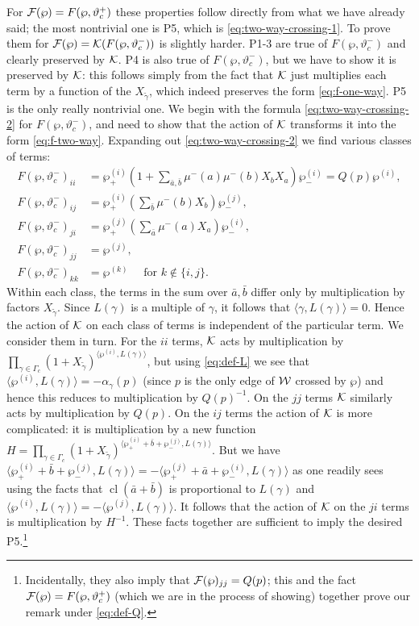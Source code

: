 \documentclass[11pt,a4paper]{article}
\def\CK {{\cal K}}
\def\CF {{\cal F}}
\def\wnet {{\cal W}}
\def\CK{{\cal K}}
\def\CK {{\cal K}}
\def\CF {{\cal F}}
\def\wnet {{\cal W}}
\def\CK{{\cal K}}
\newcommand{\inprod}[1]{\langle#1\rangle}
\DeclareMathOperator{\cl}{{cl}}
\begin{document}
For $\CF(\wp) = F(\wp, \vartheta_c^+)$ these properties follow directly from what we have already said; the most nontrivial one is
P5, which is \eqref{eq:two-way-crossing-1}.  To prove them for
$\CF(\wp) = \CK(F(\wp, \vartheta_c^-))$ is slightly harder.
P1-3 are true of $F(\wp, \vartheta_c^-)$ and clearly preserved by $\CK$.
P4 is also true of $F(\wp, \vartheta_c^-)$, but we have to show it is preserved by $\CK$:
this follows simply from the fact that $\CK$ just multiplies each term by a function of the $X_{\tilde \gamma}$,
which indeed preserves the form \eqref{eq:f-one-way}.  P5 is the only really nontrivial one.  We begin with
the formula \eqref{eq:two-way-crossing-2} for $F(\wp, \vartheta_c^-)$, and need to show that the action of $\CK$
transforms it into the form \eqref{eq:f-two-way}.  Expanding out \eqref{eq:two-way-crossing-2} we find
various classes of terms:
\begin{align}
 F(\wp, \vartheta_c^-)_{ii} &= \wp_+^{(i)} \left( 1 + \sum_{\bar a, \bar b} \mu^-(a) \mu^-(b) X_b X_a \right) \wp_-^{(i)} = Q(p) \wp^{(i)}, \\
 F(\wp, \vartheta_c^-)_{ij} &= \wp_+^{(i)} \left( \sum_{\bar b} \mu^-(b) X_b \right) \wp_-^{(j)}, \\
 F(\wp, \vartheta_c^-)_{ji} &= \wp_+^{(j)} \left( \sum_{\bar a} \mu^-(a) X_a \right) \wp_-^{(i)}, \\
 F(\wp, \vartheta_c^-)_{jj} &= \wp^{(j)}, \\
 F(\wp, \vartheta_c^-)_{kk} &= \wp^{(k)} \quad \text{ for } k \notin \{i,j\}.
\end{align}
Within each class, the terms in the sum over $\bar a, \bar b$
differ only by multiplication by factors $X_{\tilde\gamma}$.  Since $L(\gamma)$ is a multiple of
$\gamma$, it follows that $\inprod{\gamma, L(\gamma)} = 0$.  Hence the action of $\CK$ on each class of terms is independent
of the particular term.  We consider them in turn.  For the $ii$ terms, $\CK$ acts by multiplication by
$\prod_{\gamma \in \Gamma_c} (1 + X_{\tilde\gamma})^{\inprod{\wp^{(i)}, L(\gamma)}}$, but using \eqref{eq:def-L}
we see that $\inprod{\wp^{(i)}, L(\gamma)} = -\alpha_\gamma(p)$
(since $p$ is the only edge of $\wnet$ crossed by $\wp$) and hence this reduces to
multiplication by $Q(p)^{-1}$.  On the $jj$ terms $\CK$ similarly acts by multiplication by $Q(p)$.
On the $ij$ terms the action of $\CK$ is more complicated:  it is multiplication by a new function $H = \prod_{\gamma \in \Gamma_c} (1 + X_{\tilde\gamma})^{\inprod{\wp_+^{(i)} + \bar b + \wp_-^{(j)}, L(\gamma)}}$.  But we have
$\inprod{\wp_+^{(i)} + \bar b + \wp_-^{(j)}, L(\gamma)} = - \inprod{\wp_+^{(j)} + \bar a + \wp_-^{(i)}, L(\gamma)}$ as one readily
sees using the facts that $\cl(\bar a+\bar b)$ is proportional to $L(\gamma)$ and
$\inprod{\wp^{(i)}, L(\gamma)} = - \inprod{\wp^{(j)}, L(\gamma)}$.
It follows that the action of $\CK$ on the $ji$ terms is multiplication by $H^{-1}$.
These facts together are sufficient to imply the desired P5.\footnote{Incidentally, they also imply
that $\CF(\wp)_{jj} = Q(p)$; this and the fact $\CF(\wp) = F(\wp, \vartheta_c^+)$ (which we are
in the process of showing) together prove our remark under \eqref{eq:def-Q}.}
\end{document}

